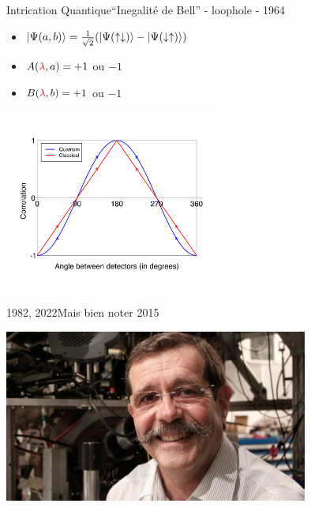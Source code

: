 \documentclass{beamer}
\begin{document}
\begin{frame}{Intrication Quantique}{``Inegalit\'{e} de Bell'' - loophole - 1964}
  \begin{center}
    \begin{itemize}
    \item $\ket{\Psi(a, b)} = \frac{1}{\sqrt{2}}(\ket{\Psi(\uparrow\downarrow)} - \ket{\Psi(\downarrow\uparrow)})$
    \item $A(\color{red}\lambda\color{black}, a) = +1$ ou $-1$
    \item $B(\color{red}\lambda\color{black}, b) = +1$ ou $-1$
    \end{itemize}
    \vspace{0.5cm}
    \includegraphics[width=7cm]{bell-svg.png}\\
  \end{center}
\end{frame}

\begin{frame}{1982, 2022}{Mais bien noter 2015}
  \begin{center}
    \includegraphics[width=10cm]{alain-aspect.jpeg}
  \end{center}
\end{frame}
\end{document}
